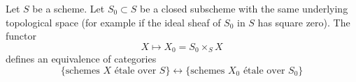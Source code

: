 %
\begin{theorem}
\label{theorem-remarkable-equivalence}
\begin{reference}
\cite[IV, Theorem 18.1.2]{EGA}
\end{reference}
Let $S$ be a scheme.
Let $S_0 \subset S$ be a closed subscheme with the same underlying
topological space (for example if the ideal sheaf of $S_0$ in $S$
has square zero). The functor
$$
X \longmapsto X_0 = S_0 \times_S X
$$
defines an equivalence of categories
$$
\{
\text{schemes }X\text{ \'etale over }S
\}
\leftrightarrow
\{
\text{schemes }X_0\text{ \'etale over }S_0
\}
$$
\end{theorem}

